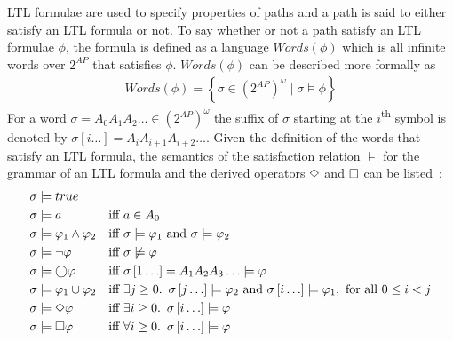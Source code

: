 LTL formulae are used to specify properties of paths and a path is said to either satisfy an LTL formula or not. To say whether or not a path satisfy an LTL formulae $\phi$, the formula is defined as a language $Words(\phi)$ which is all infinite words over $2^{AP}$ that satisfies $\phi$. $Words(\phi)$ can be described more formally as~\cite[def. 5.6]{baier2008principles}
\begin{align*}
    Words(\phi) = \left\{ \sigma \in \left( 2^{AP} \right)^\omega \mid \sigma \models \phi \right\}
\end{align*}
For a word $\sigma = A_0 A_1 A_2 \ldots \in \left( 2^{AP} \right)^\omega$ the suffix of $\sigma$ starting at the $i$\textsuperscript{th} symbol is denoted by $\sigma \left[ i \ldots \right] = A_i A_{i+1} A_{i+2} \ldots$. Given the definition of the words that satisfy an LTL formula, the semantics of the satisfaction relation $\models$ for the grammar of an LTL formula and the derived operators $\Diamond$ and $\square$ can be listed~\cite{baier2008principles}:
\begin{align}
    \sigma &\models true                && \label{eq:sem-true}\\
    \sigma &\models a                   &\text{iff }& a \in A_0 \\
    \sigma &\models \varphi_1 \land \varphi_2 &\text{iff }& \sigma \models \varphi_1 \text{ and } \sigma \models \varphi_2 \\
    \sigma &\models \lnot \varphi          &\text{iff }& \sigma \not\models \varphi\\
    \sigma &\models \bigcirc \varphi             &\text{iff }& \sigma\left[1\ldots\right] = A_1 A_2 A_3\ldots \models \varphi\\
    \sigma &\models \varphi_1 \cup \varphi_2    &\text{iff }& \exists j \geq 0.\enskip \sigma\left[j\ldots\right] \models \varphi_2 \text{ and } \sigma\left[i\ldots\right] \models \varphi_1, \text{ for all } 0 \leq i < j \\
    \sigma &\models \Diamond \varphi             &\text{iff }& \exists i \geq 0.\enskip \sigma\left[i\ldots\right] \models \varphi \\
    \sigma &\models \square \varphi             &\text{iff }& \forall i \geq 0.\enskip \sigma\left[i\ldots\right] \models \varphi \label{eq:sem-always}
\end{align}

